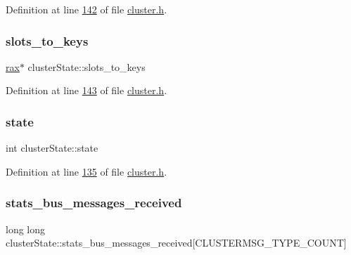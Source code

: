 Definition at line \hyperlink{cluster_8h_source_l00142}{142} of file \hyperlink{cluster_8h_source}{cluster.\+h}.

\mbox{\label{structclusterState_a75096139a10c1d93a9aa39e0127767c6}} 
\subsubsection{\texorpdfstring{slots\+\_\+to\+\_\+keys}{slots\_to\_keys}}
{\footnotesize\ttfamily \hyperlink{structrax}{rax}$\ast$ cluster\+State\+::slots\+\_\+to\+\_\+keys}



Definition at line \hyperlink{cluster_8h_source_l00143}{143} of file \hyperlink{cluster_8h_source}{cluster.\+h}.

\mbox{\label{structclusterState_a21aad7dbd75931914c80348cb00ae37b}} 
\subsubsection{\texorpdfstring{state}{state}}
{\footnotesize\ttfamily int cluster\+State\+::state}



Definition at line \hyperlink{cluster_8h_source_l00135}{135} of file \hyperlink{cluster_8h_source}{cluster.\+h}.

\mbox{\label{structclusterState_ada00674128868894d7b81a5bcadf6994}} 
\subsubsection{\texorpdfstring{stats\+\_\+bus\+\_\+messages\+\_\+received}{stats\_bus\_messages\_received}}
{\footnotesize\ttfamily long long cluster\+State\+::stats\+\_\+bus\+\_\+messages\+\_\+received\mbox{[}C\+L\+U\+S\+T\+E\+R\+M\+S\+G\+\_\+\+T\+Y\+P\+E\+\_\+\+C\+O\+U\+NT\mbox{]}}



